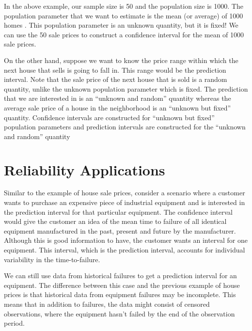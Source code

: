 \documentclass[
  letterpaper,
  DIV=11,
  numbers=noendperiod,
  oneside]{scrartcl}
\begin{document}
In the above example, our sample size is 50 and the population size is
1000. The population parameter that we want to estimate is the mean (or
average) of 1000 homes . This population
parameter is an unknown quantity, but it is fixed! We can use the 50
sale prices to construct a confidence interval for the mean of 1000 sale
prices.

On the other hand, suppose we want to know the price range within which
the next house that sells is going to fall in. This range would be the
prediction interval. Note that the sale price of the next house that is
sold is a random quantity, unlike the unknown population parameter which
is fixed. The prediction that we are interested in is an ``unknown and
random'' quantity whereas the average sale price of a house in the
neighborhood is an ``unknown but fixed'' quantity. Confidence intervals
are constructed for ``unknown but fixed'' population
parameters and prediction intervals
are constructed for the ``unknown and random'' quantity

\section{Reliability Applications}\label{reliability-applications}

Similar to the example of house sale prices, consider a scenario where a
customer wants to purchase an expensive piece of industrial equipment
and is interested in the prediction interval for that particular
equipment. The confidence interval would give the customer an idea of
the mean time to failure of all identical equipment manufactured in the
past, present and future by the manufacturer. Although this is good
information to have, the customer wants an interval for one equipment.
This interval, which is the prediction interval, accounts for individual
variability in the time-to-failure.

We can still use data from historical failures to get a prediction
interval for an equipment. The difference between this case and the
previous example of house prices is that historical data from equipment
failures may be incomplete. This means that in addition to failures, the
data might consist of censored observations, where the equipment hasn't
failed by the end of the observation period.
\end{document}
